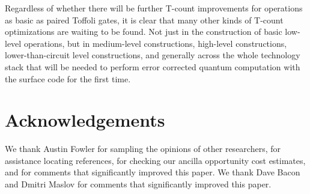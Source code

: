 \documentclass[twocolumn,accepted=2018-05-25]{quantumarticle}
\begin{document}
Regardless of whether there will be further T-count improvements for operations as basic as paired Toffoli gates, it is clear that many other kinds of T-count optimizations are waiting to be found.
Not just in the construction of basic low-level operations, but in medium-level constructions, high-level constructions, lower-than-circuit level constructions, and generally across the whole technology stack that will be needed to perform error corrected quantum computation with the surface code for the first time.


\section*{Acknowledgements}

We thank Austin Fowler for sampling the opinions of other researchers, for assistance locating references, for checking our ancilla opportunity cost estimates, and for comments that significantly improved this paper.
We thank Dave Bacon and Dmitri Maslov for comments that significantly improved this paper.



\end{document}
